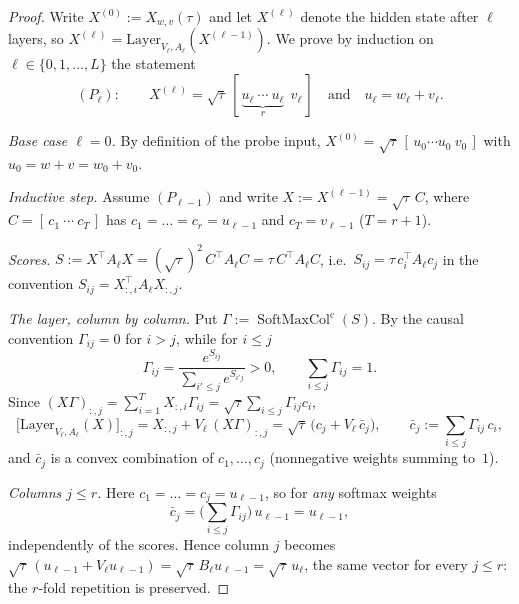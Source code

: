 \documentclass[11pt]{article}
\theoremstyle{definition}
\theoremstyle{remark}
\theoremstyle{plain}
\newcommand{\SM}{\operatorname{SoftMaxCol}^{\mathrm{c}}}
\begin{document}
\begin{proof}
Write $X^{(0)}:=X_{w,v}(\tau)$ and let $X^{(\ell)}$ denote the hidden state after $\ell$
layers, so $X^{(\ell)}=\mathrm{Layer}_{V_\ell,A_\ell}(X^{(\ell-1)})$.  We prove by
induction on $\ell\in\{0,1,\dots,L\}$ the statement
\[
(P_\ell):\qquad
X^{(\ell)}=\sqrt\tau\,[\,\underbrace{u_\ell\ \cdots\ u_\ell}_{r}\ \ v_\ell\,]
\quad\text{and}\quad u_\ell=w_\ell+v_\ell .
\]

\emph{Base case $\ell=0$.}  By definition of the probe input,
$X^{(0)}=\sqrt\tau\,[\,u_0\cdots u_0\ v_0\,]$ with $u_0=w+v=w_0+v_0$.

\emph{Inductive step.}  Assume $(P_{\ell-1})$ and write $X:=X^{(\ell-1)}=\sqrt\tau\,C$,
where $C=[\,c_1\ \cdots\ c_T\,]$ has $c_1=\dots=c_r=u_{\ell-1}$ and $c_T=v_{\ell-1}$
($T=r+1$).

\emph{Scores.}  $S:=X^\top A_\ell X=(\sqrt\tau)^2\,C^\top A_\ell C=\tau\,C^\top A_\ell C$,
i.e.\ $S_{ij}=\tau\,c_i^\top A_\ell c_j$ in the convention
$S_{ij}=X_{:,i}^\top A_\ell X_{:,j}$.

\emph{The layer, column by column.}  Put $\Gamma:=\SM(S)$.  By the causal convention
$\Gamma_{ij}=0$ for $i>j$, while for $i\le j$
\[
\Gamma_{ij}=\frac{e^{S_{ij}}}{\sum_{i'\le j}e^{S_{i'j}}}>0,
\qquad\sum_{i\le j}\Gamma_{ij}=1 .
\]
Since $(X\Gamma)_{:,j}=\sum_{i=1}^{T}X_{:,i}\Gamma_{ij}=\sqrt\tau\sum_{i\le j}\Gamma_{ij}c_i$,
\[
\big[\mathrm{Layer}_{V_\ell,A_\ell}(X)\big]_{:,j}
=X_{:,j}+V_\ell\,(X\Gamma)_{:,j}
=\sqrt\tau\,\big(c_j+V_\ell\,\bar c_j\big),
\qquad
\bar c_j:=\sum_{i\le j}\Gamma_{ij}\,c_i,
\]
and $\bar c_j$ is a convex combination of $c_1,\dots,c_j$ (nonnegative weights summing
to~$1$).

\emph{Columns $j\le r$.}  Here $c_1=\dots=c_j=u_{\ell-1}$, so for \emph{any} softmax
weights
\[
\bar c_j=\Big(\sum_{i\le j}\Gamma_{ij}\Big)\,u_{\ell-1}=u_{\ell-1},
\]
independently of the scores.  Hence column $j$ becomes
$\sqrt\tau\,(u_{\ell-1}+V_\ell u_{\ell-1})=\sqrt\tau\,B_\ell u_{\ell-1}
=\sqrt\tau\,u_\ell$, the same vector for every $j\le r$: the $r$-fold repetition is
preserved.


\end{proof}
\end{document}
